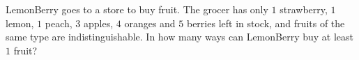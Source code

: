 LemonBerry goes to a store to buy fruit. The grocer has only $1$ strawberry, $1$ lemon, $1$ peach, $3$ apples, $4$ oranges and $5$ berries left in stock, and fruits of the same type are indistinguishable. In how many ways can LemonBerry buy at least $1$ fruit?
